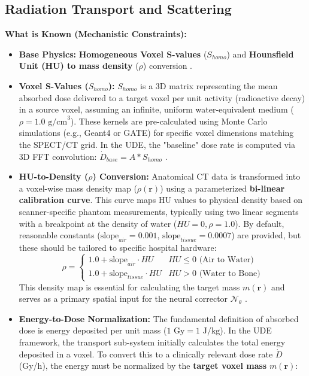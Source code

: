 \documentclass[11pt,a4paper]{article}
\begin{document}
\subsection{Radiation Transport and Scattering}
\textbf{What is Known (Mechanistic Constraints):}
\begin{itemize}
    \item \textbf{Base Physics:} \textbf{Homogeneous Voxel S-values} ($S_{homo}$) and \textbf{Hounsfield Unit (HU) to mass density} ($\rho$) conversion \cite{GtzSchmidkonz2019}.
    \item \textbf{Voxel S-Values ($S_{homo}$):} $S_{homo}$ is a 3D matrix representing the mean absorbed dose delivered to a target voxel per unit activity (radioactive decay) in a source voxel, assuming an infinite, uniform water-equivalent medium ($\rho = 1.0 \text{ g/cm}^3$). These kernels are pre-calculated using Monte Carlo simulations (e.g., Geant4 or GATE) for specific voxel dimensions matching the SPECT/CT grid. In the UDE, the "baseline" dose rate is computed via 3D FFT convolution: $\dot{D}_{base} = A \ast S_{homo}$ \cite{PistoneAuditore2022}.
    \item \textbf{HU-to-Density ($\rho$) Conversion:} Anatomical CT data is transformed into a voxel-wise mass density map ($\rho(\mathbf{r})$) using a parameterized \textbf{bi-linear calibration curve}. This curve maps HU values to physical density based on scanner-specific phantom measurements, typically using two linear segments with a breakpoint at the density of water ($HU=0, \rho=1.0$). By default, reasonable constants ($\text{slope}_{air} = 0.001$, $\text{slope}_{tissue} = 0.0007$) are provided, but these should be tailored to specific hospital hardware:
    \begin{equation}
        \rho = \begin{cases} 1.0 + \text{slope}_{air} \cdot HU & HU \leq 0 \text{ (Air to Water)} \\ 1.0 + \text{slope}_{tissue} \cdot HU & HU > 0 \text{ (Water to Bone)} \end{cases}
    \end{equation}
    This density map is essential for calculating the target mass $m(\mathbf{r})$ and serves as a primary spatial input for the neural corrector $\mathcal{N}_\theta$ \cite{GtzSchmidkonz2019, BaileyMarquis2022}.
    \item \textbf{Energy-to-Dose Normalization:} The fundamental definition of absorbed dose is energy deposited per unit mass ($1 \text{ Gy} = 1 \text{ J/kg}$). In the UDE framework, the transport sub-system initially calculates the total energy deposited in a voxel. To convert this to a clinically relevant dose rate $\dot{D}$ (Gy/h), the energy must be normalized by the \textbf{target voxel mass} $m(\mathbf{r})$:

\end{itemize}
\end{document}
